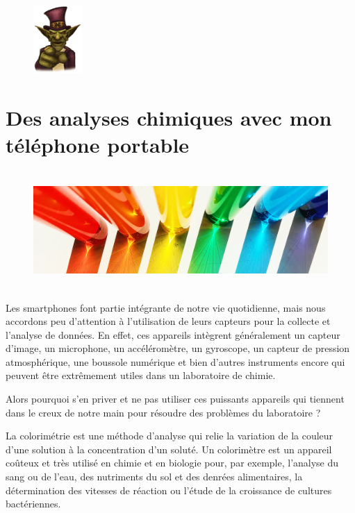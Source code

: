 \documentclass[
  10pt,
  french,
  a5paper,
  openany]{book}
\begin{document}
\begin{figure}

\hfill{}\includegraphics[height=7em]{images/le-jeu-video-fiction-ou-realite-2} 

\end{figure}

\hypertarget{des-analyses-chimiques-avec-mon-tuxe9luxe9phone-portable}{%
\chapter{Des analyses chimiques avec mon téléphone portable}\label{des-analyses-chimiques-avec-mon-tuxe9luxe9phone-portable}}

\begin{figure}

{\centering \includegraphics[height=12em]{images/analyses-chimiques-telephone-portable} 

}

\end{figure}

Les smartphones font partie intégrante de notre vie quotidienne, mais nous accordons peu d'attention à l'utilisation de leurs capteurs pour la collecte et l'analyse de données. En effet, ces appareils intègrent généralement un capteur d'image, un microphone, un accéléromètre, un gyroscope, un capteur de pression atmosphérique, une boussole numérique et bien d'autres instruments encore qui peuvent être extrêmement utiles dans un laboratoire de chimie.

Alors pourquoi s'en priver et ne pas utiliser ces puissants appareils qui tiennent dans le creux de notre main pour résoudre des problèmes du laboratoire ?

La colorimétrie est une méthode d'analyse qui relie la variation de la couleur d'une solution à la concentration d'un soluté. Un colorimètre est un appareil coûteux et très utilisé en chimie et en biologie pour, par exemple, l'analyse du sang ou de l'eau, des nutriments du sol et des denrées alimentaires, la détermination des vitesses de réaction ou l'étude de la croissance de cultures bactériennes.
\end{document}
